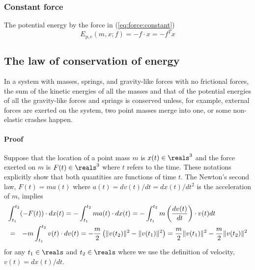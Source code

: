 \documentclass{article}
\begin{document}
\subsubsection{Constant force}

The potential energy by the force in (\ref{eq:force:constant})
\begin{equation}
\label{eq:energy:potential:constant}
E_\mathrm{p,c}(m,x;f)
=  - f\cdot x
= - f^Tx
\end{equation}


\subsection{The law of conservation of energy}

In a system with masses, springs, and gravity-like forces with no frictional forces,
the sum of the kinetic energies of all the masses
and that of the potential energies of all the gravity-like forces and springs
is conserved
unless, for example, external forces are exerted on the system,
two point masses merge into one,
or some non-elastic crashes happen.

\paragraph{Proof}
\label{paragraph:proof}

Suppose that the location of a point mass $m$ is $x(t)\in\reals^3$
and the force exerted on $m$ is $F(t)\in\reals^3$ where $t$ refers to the time.
These notations explicitly show that both quantities are functions of time $t$.
The Newton's second law, $F(t) = m a(t)$ where $a(t) = dv(t)/dt = {dx(t)}/{dt^2}$ is the acceleration of $m$,
implies
\begin{eqnarray}
\nonumber
\lefteqn{
\int_{t_1}^{t_2} (-F(t)) \cdot d x(t)
=
	- \int_{t_1}^{t_2} m a(t) \cdot d x(t)
=
	- \int_{t_1}^{t_2} m \left( \frac{dv(t)}{dt} \right) \cdot v(t) dt
}
\\
&=&
	- m \int_{t_1}^{t_2} {v(t)} \cdot dv(t)
=
	- \frac{m}{2}\left(
		\|v(t_2)\|^2 - \|v(t_1)\|^2
	\right)
=
	\frac{m}{2} \|v(t_1)\|^2
	- \frac{m}{2} \|v(t_2)\|^2
\label{eq:energy:conserve:1}
\end{eqnarray}
for any $t_1\in\reals$ and $t_2\in\reals$
where we use the definition of velocity,
$v(t) = {dx(t)}/{dt}$.
\end{document}
